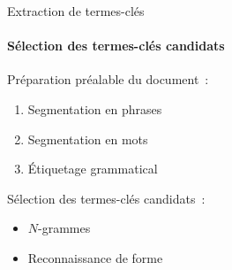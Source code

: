   \begin{frame}{Extraction de termes-clés}\framesubtitle{Sélection des termes-clés candidats}
    Préparation préalable du document~:
    \begin{enumerate}
      \item{Segmentation en phrases}
      \item{Segmentation en mots}
      \item{Étiquetage grammatical}
    \end{enumerate}

    \vspace{1em}

    Sélection des termes-clés candidats~:
    \begin{itemize}
      \item{$N$-grammes}
      \item{Reconnaissance de forme}
    \end{itemize}
  \end{frame}

